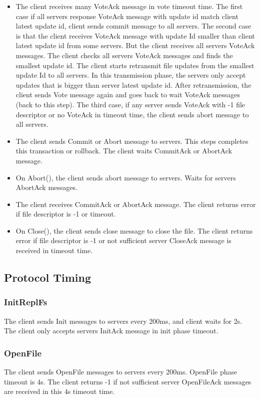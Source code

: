 \documentclass[12pt,fleqn]{article}
\begin{document}
\begin{itemize}
	\item The client receives many VoteAck message in vote timeout time. The first case if all servers response VoteAck message with update id match client latest update id, client sends commit message to all servers. The second case is that the client receives VoteAck message with update Id smaller than client latest update id from some servers. But the client receives all servers VoteAck messages. The client checks all servers VoteAck messages and finds the smallest update id. The client starts retransmit file updates from the smallest update Id to all servers. In this transmission phase, the servers only accept updates that is bigger than server latest update id. After retransmission, the client sends Vote message again and goes back to wait VoteAck messages (back to this step). The third case, if any server sends VoteAck with -1 file descriptor or no VoteAck in timeout time, the client sends abort message to all servers.
	\item The client sends Commit or Abort message to servers. This steps completes this transaction or rollback. The client waits CommitAck or AbortAck message.
	\item On Abort(), the client sends abort message to servers. Waits for servers AbortAck messages.
	\item The client receives CommitAck or AbortAck message. The client returns error if file descriptor is -1 or timeout.
	\item  On Close(), the client sends close message to close the file. The client returns error if file descriptor is -1 or not sufficient server CloseAck message is received in timeout time.
\end{itemize}

\subsection{Protocol Timing}
\subsubsection{InitReplFs}
The client sends Init messages to servers every 200ms, and client waits for 2s. The client only accepts servers InitAck message in init phase timeout. 

\subsubsection{OpenFile}
The client sends OpenFile messages to servers every 200ms. OpenFile phase timeout is 4s. The client returns -1 if not sufficient server OpenFileAck messages are received in this 4s timeout time.
\end{document}
